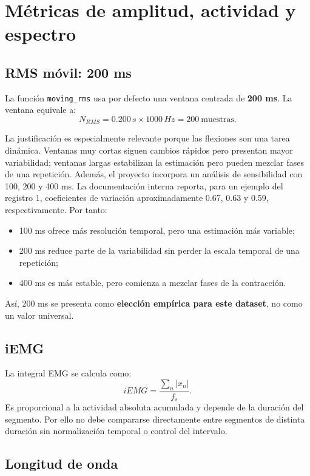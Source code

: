 \documentclass[11pt,spanish]{article}
\begin{document}
\section{Métricas de amplitud, actividad y espectro}

\subsection{RMS móvil: 200 ms}

La función \texttt{moving\_rms} usa por defecto una ventana centrada de \textbf{200 ms}. La ventana equivale a:
\begin{equation}
N_{RMS}=0.200\,s\times1000\,Hz=200\ \text{muestras}.
\end{equation}

La justificación es especialmente relevante porque las flexiones son una tarea dinámica. Ventanas muy cortas siguen cambios rápidos pero presentan mayor variabilidad; ventanas largas estabilizan la estimación pero pueden mezclar fases de una repetición.
Además, el proyecto incorpora un análisis de sensibilidad con 100, 200 y 400 ms. La documentación interna reporta, para un ejemplo del registro 1, coeficientes de variación aproximadamente 0.67, 0.63 y 0.59, respectivamente. Por tanto:
\begin{itemize}
    \item 100 ms ofrece más resolución temporal, pero una estimación más variable;
    \item 200 ms reduce parte de la variabilidad sin perder la escala temporal de una repetición;
    \item 400 ms es más estable, pero comienza a mezclar fases de la contracción.
\end{itemize}
Así, 200 ms se presenta como \textbf{elección empírica para este dataset}, no como un valor universal.

\subsection{iEMG}

La integral EMG se calcula como:
\begin{equation}
iEMG=\frac{\sum_n |x_n|}{f_s}.
\end{equation}
Es proporcional a la actividad absoluta acumulada y depende de la duración del segmento. Por ello no debe compararse directamente entre segmentos de distinta duración sin normalización temporal o control del intervalo.

\subsection{Longitud de onda}
\end{document}
